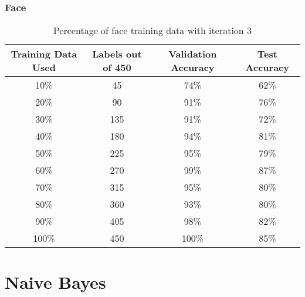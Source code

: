 \documentclass{article}
\begin{document}
        \subsubsection{Face}
            \begin{table}[h]
                \centering
                \begin{tabular}{c|c|c|c}
                    \hline
                        Training Data Used & Labels out of 450 & Validation Accuracy & Test Accuracy \\
                    \hline
                        10\% & 45 & 74\% & 62\%\\
                    \hline
                        20\% & 90 & 91\% & 76\%\\
                    \hline
                        30\% & 135 & 91\% & 72\%\\
                    \hline
                        40\% & 180 & 94\% & 81\%\\
                    \hline
                        50\% & 225 & 95\% & 79\%\\
                    \hline
                        60\% & 270 & 99\% & 87\%\\
                    \hline
                        70\% & 315 & 95\% & 80\%\\
                    \hline
                        80\% & 360 & 93\% & 80\%\\
                    \hline
                        90\% & 405 & 98\% & 82\%\\
                    \hline
                        100\% & 450 & 100\% & 85\%\\
                    \hline
                \end{tabular}
                \caption{Percentage of face training data with iteration 3}
            \end{table}
         
\section{Naive Bayes}
\end{document}

